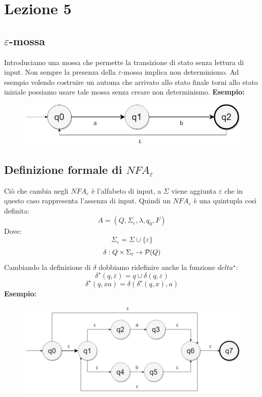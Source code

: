 

\section{Lezione 5}
\subsection{$\varepsilon$-mossa}
Introduciamo una mossa che permette la transizione di stato senza lettura di input. Non sempre la presenza della $\varepsilon$-mossa implica non determinismo.\newline
Ad esempio volendo costruire un automa che arrivato allo stato finale torni allo stato iniziale possiamo usare tale mossa senza creare non determinismo.\newline
\textbf{Esempio:}
\begin{figure}[H]
\includegraphics[scale=0.5]{l5_1}
\end{figure}
\subsection{Definizione formale di $NFA_{\varepsilon}$}
Ci\`o che cambia negli $NFA_{\varepsilon}$ \`e l'alfabeto di input, a $\Sigma$ viene aggiunta $\varepsilon$ che in questo caso rappresenta l'assenza di input. Quindi un $NFA_{\varepsilon}$ \`e una quintupla cos\`i definita:
\[
	A = (Q, \Sigma_{\varepsilon}, \lambda, q_0, F)
\]
Dove:
\[
	\Sigma_{\varepsilon} = \Sigma \cup \{\varepsilon\}
\]
\[
	\delta : Q \times \Sigma_{\varepsilon} \to {\cal P} (Q)
\]
Cambiando la definizione di $\delta$ dobbiamo ridefinire anche la funzione $delta^{\star}$:
\[
	\delta^{\star} (q, \varepsilon) = {q} \cup \delta(q, \varepsilon) 
\]
\[
	\delta^{\star} (q, xa) = \delta(\delta^{\star} (q, x), a)
\]
\textbf{Esempio:}
\begin{figure}[H]
	\includegraphics[scale=0.5]{l5_2}
\end{figure}

